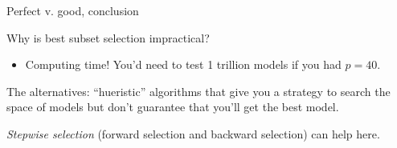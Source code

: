 \documentclass[mathserif, aspectratio=169]{beamer}
\begin{document}
\begin{frame}{Perfect v. good, conclusion}

Why is best subset selection impractical?
\begin{itemize}
\item Computing time!  You'd need to test 1 trillion models if you had $p=40$.
\end{itemize}

\vspace{5mm}

The alternatives: ``hueristic'' algorithms that give you a strategy to search the space of models but don't guarantee that you'll get the best model.  

\vspace{5mm}

\textit{Stepwise selection} (forward selection and backward selection) can help here.
\end{frame}


%
%
%
\end{document}
